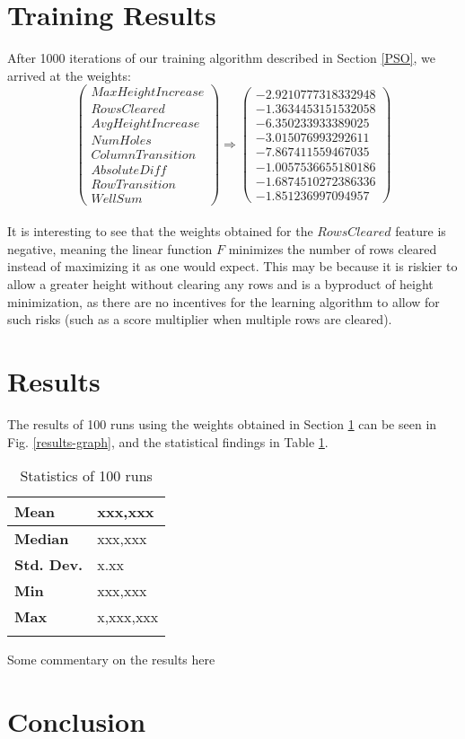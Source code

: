 \documentclass[12pt]{article}
\numberwithin{table}{section}
\begin{document}
\section{Training Results}\label{weights}
After 1000 iterations of our training algorithm described in Section \ref{PSO}, we arrived at the weights:
$$
\left( \begin{array}{c} 
MaxHeightIncrease
\\RowsCleared
\\AvgHeightIncrease
\\NumHoles
\\ColumnTransition
\\AbsoluteDiff
\\RowTransition
\\WellSum
\end{array} \right)
\Longrightarrow\left( \begin{array}{c}
-2.9210777318332948
\\-1.3634453151532058
\\-6.350233933389025
\\-3.015076993292611
\\-7.867411559467035
\\-1.0057536655180186
\\-1.6874510272386336
\\-1.851236997094957
\end{array} \right)
$$
\\
It is interesting to see that the weights obtained for the $RowsCleared$ feature is negative, meaning the linear function $F$ minimizes the number of rows cleared instead of maximizing it as one would expect. This may be because it is riskier to allow a greater height without clearing any rows and is a byproduct of height minimization, as there are no incentives for the learning algorithm to allow for such risks (such as a score multiplier when multiple rows are cleared). 

\section{Results}
The results of 100 runs using the weights obtained in Section \ref{weights} can be seen in Fig. \ref{results-graph}, and the statistical findings in Table \ref{results-table}.

\begin{longtable}{|l|l|}
\hline
\textbf{Mean}      &  xxx,xxx	\\ \hline
\textbf{Median}    &  xxx,xxx	\\ \hline
\textbf{Std. Dev.} &  x.xx		\\ \hline
\textbf{Min}       &  xxx,xxx	\\ \hline
\textbf{Max}       &  x,xxx,xxx	\\ \hline
\caption{Statistics of 100 runs}
\label{results-table}
\end{longtable}

Some commentary on the results here

\section{Conclusion}

\printbibliography
\end{document}
